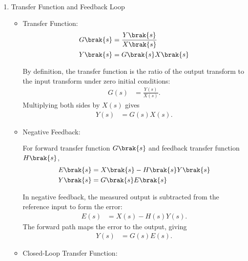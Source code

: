 \begin{enumerate}[label=\thesubsection.\arabic*, ref=\thesubsection.\theenumi,itemsep=0pt]
\begin{itemize}
Using the process gain and maximum slope definitions in \eqref{eq:process_gain} and \eqref{eq:maximum_slope},
\begin{align}
\tau
&= \frac{K\Delta u}{R}
\label{eq:fopdt_time_constant}
\end{align}


\solution
For the first-order model, the initial tangent slope is $R=\Delta y/\tau$. Since $\Delta y=K\Delta u$, substitute to obtain
\begin{align}
R&=\frac{K\Delta u}{\tau}
\quad\implies\quad
\tau=\frac{K\Delta u}{R}.
\end{align}
\end{itemize}

\item Transfer Function and Feedback Loop
\begin{itemize}

\item Transfer Function:
\begin{align}
G\brak{s}
&= \frac{Y\brak{s}}{X\brak{s}}
\label{eq:transfer_function}\\
Y\brak{s}
&= G\brak{s}X\brak{s}
\label{eq:transfer_relation}
\end{align}


\solution
By definition, the transfer function is the ratio of the output transform to the input transform under zero initial conditions:
\begin{align}
G(s)&=\frac{Y(s)}{X(s)}.
\end{align}
Multiplying both sides by $X(s)$ gives
\begin{align}
Y(s)&=G(s)X(s).
\end{align}
\item Negative Feedback:

For forward transfer function $G\brak{s}$ and feedback transfer function $H\brak{s}$,
\begin{align}
E\brak{s}
&= X\brak{s}-H\brak{s}Y\brak{s}
\label{eq:feedback_error}\\
Y\brak{s}
&= G\brak{s}E\brak{s}
\label{eq:feedback_output}
\end{align}


\solution
In negative feedback, the measured output is subtracted from the reference input to form the error:
\begin{align}
E(s)&=X(s)-H(s)Y(s).
\end{align}
The forward path maps the error to the output, giving
\begin{align}
Y(s)&=G(s)E(s).
\end{align}
\item Closed-Loop Transfer Function:


\end{itemize}
\end{enumerate}
